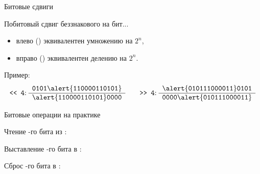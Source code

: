 \begin{frame}{Битовые сдвиги}

  Побитовый сдвиг беззнакового  на  бит...
  \begin{itemize}
    \item влево () эквивалентен умножению на $2^n$,
    \item вправо () эквивалентен делению на $2^n$.
  \end{itemize}

  \begin{block}{Пример:}
    \reduceBlockEqSpacing
    \begin{equation*}
      \text{\code{<{}< 4}:}\thickspace
      \begin{array}{r}
        \pcnum{0101 \alert{1100 0011 0101}} \\
        \hline
        \pcnum{\alert{1100 0011 0101} 0000} \\
      \end{array}
      \qquad
      \text{\code{>{}> 4}:}\thickspace
      \begin{array}{r}
        \pcnum{\alert{0101 1100 0011} 0101} \\
        \hline
        \pcnum{0000 \alert{0101 1100 0011}} \\
      \end{array}
    \end{equation*}
  \end{block}

\end{frame}

\begin{frame}{Битовые операции на практике}

  \begin{block}{Чтение -го бита из :}
  \end{block}

  \begin{block}{Выставление -го бита в :}
  \end{block}

  \begin{block}{Сброс -го бита в :}
  \end{block}


\end{frame}

